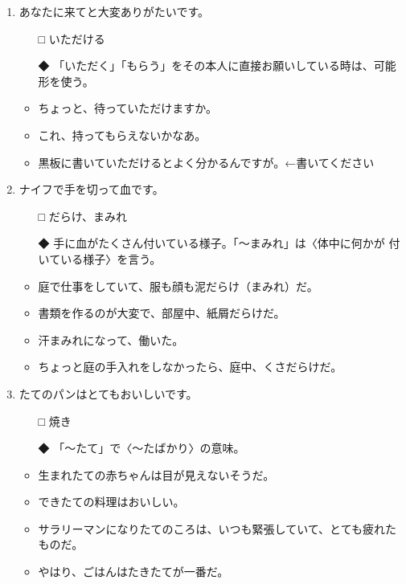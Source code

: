 \documentclass[
uplatex,
b5paper,
10pt,
dvipdfmx
]{jsbook}
\begin{document}
\begin{enumerate}

\item あなたに来て\underline{\hspace{3zw}}と大変ありがたいです。
\begin{itemize}
\item[□] いただける
\item[◆] 「いただく」「もらう」をその本人に直接お願いしている時は、可能
	  形を使う。
\end{itemize}
\begin{itemize}
\item ちょ{}っと、待っていただけますか。
\item これ、持ってもらえないかなあ。
\item 黒板に書いていただけるとよく分かるんですが。←書いてください
\end{itemize}

\item ナイフで手を切って血\underline{\hspace{3zw}}です。
\begin{itemize}
\item[□] だらけ、まみれ
\item[◆] 手に血がたくさん付いている様子。「〜まみれ」は〈体中に何かが
	  付いている様子〉を言う。
\end{itemize}
\begin{itemize}
\item 庭で仕事をしていて、服も顔も泥だらけ（まみれ）だ。
\item 書類を作るのが大変で、部屋中、紙屑だらけだ。
\item 汗まみれになって、働いた。
\item ちょ{}っと庭の手入れをしなかったら、庭中、くさだらけだ。
\end{itemize}

\item \underline{\hspace{3zw}}たてのパンはとてもおいしいです。
\begin{itemize}
\item[□] 焼き
\item[◆] 「〜たて」で〈〜たばかり〉の意味。
\end{itemize}
\begin{itemize}
\item 生まれたての赤ちゃんは目が見えないそうだ。
\item できたての料理はおいしい。
\item サラリーマンになりたてのころは、いつも緊張していて、とても疲れたものだ。
\item やはり、ごはんはたきたてが一番だ。
\end{itemize}


\end{enumerate}
\end{document}
